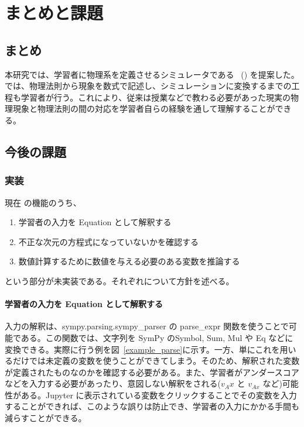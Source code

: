 \chapter{まとめと課題} \label{conclusion}

\section{まとめ}
本研究では、学習者に物理系を定義させるシミュレータである \simname~(\simnamealt) を提案した。\simname では、物理法則から現象を数式で記述し、シミュレーションに変換するまでの工程も学習者が行う。これにより、従来は授業などで教わる必要があった現実の物理現象と物理法則の間の対応を学習者自らの経験を通して理解することができる。

\section{今後の課題}

\subsection{実装}

現在 \simname の機能のうち、
\begin{enumerate}
  \item 学習者の入力を Equation として解釈する
  \item 不正な次元の方程式になっていないかを確認する
  \item 数値計算するために数値を与える必要のある変数を推論する
\end{enumerate}
という部分が未実装である。それぞれについて方針を述べる。

\subsubsection*{学習者の入力を Equation として解釈する}
入力の解釈は、sympy.parsing.sympy\_parser の parse\_expr 関数を使うことで可能である。この関数では、文字列を SymPy のSymbol, Sum, Mul や Eq などに変換できる。実際に行う例を図~\ref{example_parse}に示す。一方、単にこれを用いるだけでは未定義の変数を使うことができてしまう。そのため、解釈された変数が定義されたものなのかを確認する必要がある。また、学習者がアンダースコアなどを入力する必要があったり、意図しない解釈をされる($v_Ax$ と $v_{Ax}$ など)可能性がある。Jupyter に表示されている変数をクリックすることでその変数を入力することができれば、このような誤りは防止でき、学習者の入力にかかる手間も減らすことができる。

